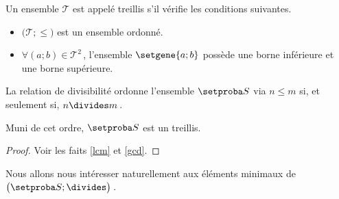 Un ensemble $\mathcal{T}$ est appelé treillis s'il vérifie les conditions suivantes.
%
	\begin{itemize}
		\item $\big( \mathcal{T} ; \leq \big)$ est un ensemble ordonné.

		\item $\forall (a ; b) \in \mathcal{T}^2$\,, l'ensemble $\setgene{a ; b}$ possède une borne inférieure et une borne supérieure.
	\end{itemize}

\begin{fact}
	La relation de divisibilité ordonne l'ensemble $\ourset$ via $n  \leq m$ si, et seulement si, $n \divides m$\,.
	
	\medskip
	
	Muni de cet ordre, $\ourset$ est un treillis.
\end{fact}

\begin{proof}
	Voir les faits \ref{lcm} et \ref{gcd}.
\end{proof}




Nous allons nous intéresser naturellement aux éléments minimaux de $\big( \ourset ; \divides \big)$\,.
